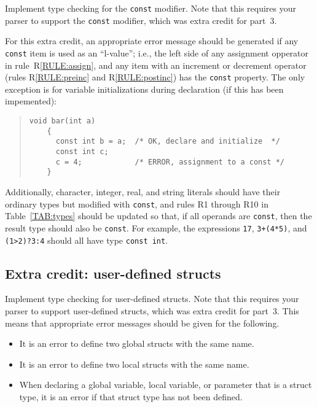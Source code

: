 \documentclass{article}
\newcounter{rule}
\newcommand{\parser}{3}
\begin{document}
Implement type checking for the {\tt const} modifier.
Note that this requires your parser to support the {\tt const}
modifier, which was extra credit for part~\parser.

For this extra credit,
an appropriate error message should be generated
if any {\tt const} item is used as an ``l-value'';
i.e., the left side of any assignment opperator
in rule~R\ref{RULE:assign},
and any item with an increment or decrement operator
(rules R\ref{RULE:preinc} and R\ref{RULE:postinc})
has the {\tt const} property.
The only exception is for variable initializations during declaration
(if this has been impemented):
\begin{quote}
  \begin{lstlisting}[numbers=none]
    void bar(int a)
    {
      const int b = a;  /* OK, declare and initialize  */
      const int c;
      c = 4;            /* ERROR, assignment to a const */
    }
  \end{lstlisting}
\end{quote}
Additionally,
character, integer, real, and string literals
should have their ordinary types but modified with {\tt const},
and rules R1 through R10 in Table~\ref{TAB:types}
should be updated so that, if all operands are {\tt const},
then the result type should also be {\tt const}.
For example, the expressions \verb|17|, \verb|3+(4*5)|,
and \verb|(1>2)?3:4|
should all have type {\tt const int}.


\subsection{Extra credit: user-defined structs}
\label{SEC:userstructs}

Implement type checking for user-defined structs.
Note that this requires your parser to support user-defined structs,
which was extra credit for part~\parser.
This means that appropriate error messages should be given for the following.
\begin{itemize}
  \item
  It is an error to define two global structs with the same name.

  \item
  It is an error to define two local structs with the same name.

  \item
  When declaring a global variable, local variable,
  or parameter that is a struct type,
  it is an error if that struct type has not been defined.
\end{itemize}
\end{document}
